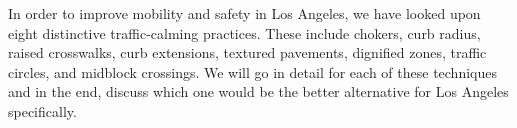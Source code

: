 In order to improve mobility and safety in Los Angeles, we have looked upon eight distinctive traffic-calming practices. These include chokers, curb radius, raised crosswalks, curb extensions, textured pavements, dignified zones, traffic circles, and midblock crossings. We will go in detail for each of these techniques and in the end, discuss which one would be the better alternative for Los Angeles specifically. 